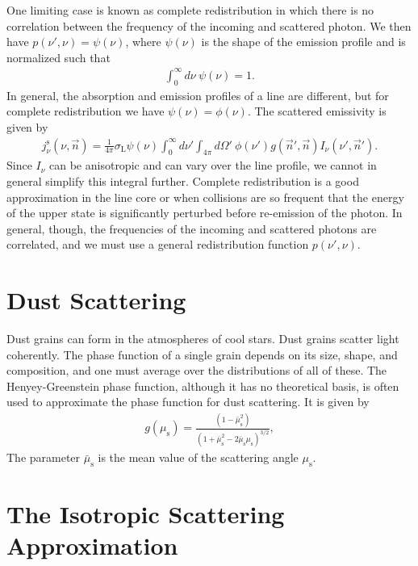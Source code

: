 One limiting case is known as complete redistribution in
which there is no correlation between the frequency of the
incoming and scattered photon. We then have $p(\nu',\nu) =
\psi(\nu)$, where $\psi(\nu)$ is the shape of the emission profile and is
 normalized such that
\begin{align}
\int_0^\infty\!\!\!d\nu\:\psi(\nu) = 1.
\end{align}
In general, the absorption and emission profiles of a line
are different, but for complete redistribution we have
$\psi(\nu) = \phi(\nu)$. The scattered emissivity is given
by
\begin{align}
j_\nu^\mathrm{s}(\nu, \vec n) = 
\frac{1}{4\pi}
\sigma_\mathrm{L}
\psi(\nu)
\int_0^\infty \!\!\! d\nu' 
\int_{4\pi} \!\!\! d\Omega'
\:
\phi(\nu')
g(\vec n', \vec n)
I_\nu(\nu', \vec n').
\end{align}
Since $I_\nu$ can be anisotropic and can vary over the line
profile, we cannot in general simplify this integral
further. Complete redistribution is a good approximation in
the line core or when collisions are so frequent that the
energy of the upper state is significantly perturbed before
re-emission of the photon. In general, though, the
frequencies of the incoming and scattered photons are
correlated, and we must use a general redistribution
function $p(\nu',\nu)$.

\section{Dust Scattering}

Dust grains can form in the atmospheres of cool stars. Dust
grains scatter light coherently. The phase function of a
single grain depends on its size, shape, and composition,
and one must average over the distributions of all of these.
The Henyey-Greenstein phase function, although it has no
theoretical basis, is often used to approximate the phase
function for dust scattering. It is given by
\begin{align}
g(\mu_\mathrm{s}) = 
\frac{(1 - \bar\mu_\mathrm{s}^2)}{(1 + \bar\mu_\mathrm{s}^2 - 2
\bar\mu_\mathrm{s}\mu_\mathrm{s})^{3/2}},
\end{align}
The parameter $\bar\mu_\mathrm{s}$ is the mean value of the
scattering angle $\mu_\mathrm{s}$.


\section{The Isotropic Scattering Approximation}

